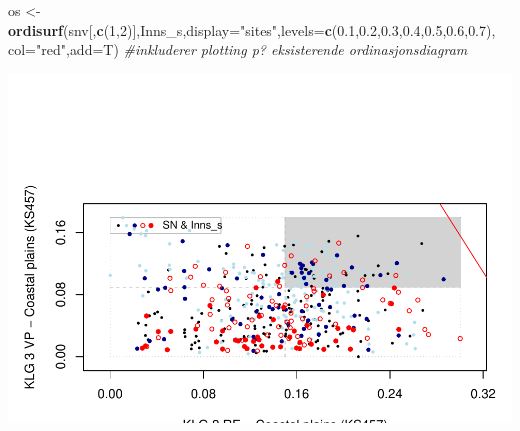 \documentclass[]{article}
\newenvironment{Shaded}{\begin{snugshade}}{\end{snugshade}}
\newcommand{\CommentTok}[1]{\textcolor[rgb]{0.56,0.35,0.01}{\textit{#1}}}
\newcommand{\DataTypeTok}[1]{\textcolor[rgb]{0.13,0.29,0.53}{#1}}
\newcommand{\DecValTok}[1]{\textcolor[rgb]{0.00,0.00,0.81}{#1}}
\newcommand{\FloatTok}[1]{\textcolor[rgb]{0.00,0.00,0.81}{#1}}
\newcommand{\KeywordTok}[1]{\textcolor[rgb]{0.13,0.29,0.53}{\textbf{#1}}}
\newcommand{\NormalTok}[1]{#1}
\newcommand{\StringTok}[1]{\textcolor[rgb]{0.31,0.60,0.02}{#1}}
\begin{document}
\begin{Shaded}
\begin{Highlighting}[]
\NormalTok{os <-}\StringTok{ }\KeywordTok{ordisurf}\NormalTok{(snv[,}\KeywordTok{c}\NormalTok{(}\DecValTok{1}\NormalTok{,}\DecValTok{2}\NormalTok{)],Inns_s,}\DataTypeTok{display=}\StringTok{"sites"}\NormalTok{,}\DataTypeTok{levels=}\KeywordTok{c}\NormalTok{(}\FloatTok{0.1}\NormalTok{,}\FloatTok{0.2}\NormalTok{,}\FloatTok{0.3}\NormalTok{,}\FloatTok{0.4}\NormalTok{,}\FloatTok{0.5}\NormalTok{,}\FloatTok{0.6}\NormalTok{,}\FloatTok{0.7}\NormalTok{), }\DataTypeTok{col=}\StringTok{"red"}\NormalTok{,}\DataTypeTok{add=}\NormalTok{T) }\CommentTok{#inkluderer plotting p? eksisterende ordinasjonsdiagram}
\end{Highlighting}
\end{Shaded}

\includegraphics{Landscape_analysis_example_4_files/figure-latex/unnamed-chunk-50-1.pdf}
\end{document}

